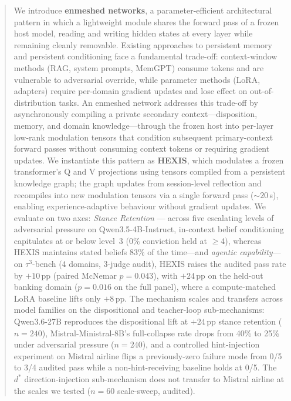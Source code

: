 %

\begin{abstract}
We introduce \textbf{enmeshed networks}, a parameter-efficient architectural pattern in which a lightweight module shares the forward pass of a frozen host model, reading and writing hidden states at every layer while remaining cleanly removable. Existing approaches to persistent memory and persistent conditioning face a fundamental trade-off: context-window methods (RAG, system prompts, MemGPT) consume tokens and are vulnerable to adversarial override, while parameter methods (LoRA, adapters) require per-domain gradient updates and lose effect on out-of-distribution tasks. An enmeshed network addresses this trade-off by asynchronously compiling a private secondary context—disposition, memory, and domain knowledge—through the frozen host into per-layer low-rank modulation tensors that condition subsequent primary-context forward passes without consuming context tokens or requiring gradient updates. We instantiate this pattern as \textbf{HEXIS}, which modulates a frozen transformer's Q and V projections using tensors compiled from a persistent knowledge graph; the graph updates from session-level reflection and recompiles into new modulation tensors via a single forward pass (${\sim}20$\,s), enabling experience-adaptive behaviour without gradient updates. We evaluate on two axes: \textit{Stance Retention} --- across five escalating levels of adversarial pressure on Qwen3.5-4B-Instruct, in-context belief conditioning capitulates at or below level~3 (0\% conviction held at $\geq$4), whereas HEXIS maintains stated beliefs 83\% of the time---and \textit{agentic capability}---on $\tau^3$-bench (4 domains, 3-judge audit), HEXIS raises the audited pass rate by $+10$\,pp (paired McNemar $p{=}0.043$), with $+24$\,pp on the held-out banking domain ($p{=}0.016$ on the full panel), where a compute-matched LoRA baseline lifts only $+8$\,pp. The mechanism scales and transfers across model families on the dispositional and teacher-loop sub-mechanisms: Qwen3.6-27B reproduces the dispositional lift at $+24$\,pp stance retention ($n{=}240$), Mistral-Ministral-8B's full-collapse rate drops from 40\% to 25\% under adversarial pressure ($n{=}240$), and a controlled hint-injection experiment on Mistral airline flips a previously-zero failure mode from 0/5 to 3/4 audited pass while a non-hint-receiving baseline holds at 0/5. The $d^*$ direction-injection sub-mechanism does not transfer to Mistral airline at the scales we tested ($n{=}60$ scale-sweep, audited).

\end{abstract}
